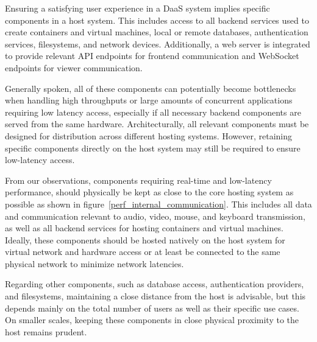 \documentclass[runningheads]{llncs}
\begin{document}
Ensuring a satisfying user experience in a DaaS system
implies specific components in a host system.
This includes access to all backend services
used to create containers and virtual machines,
local or remote databases, authentication services, filesystems, and network devices.
Additionally, a web server is integrated to provide relevant API endpoints
for frontend communication and WebSocket endpoints for viewer communication.

Generally spoken, all of these components can potentially become bottlenecks
when handling high throughputs or large amounts of concurrent applications
requiring low latency access, especially if all necessary backend components
are served from the same hardware.
Architecturally, all relevant components
must be designed for distribution across different hosting systems.
However, retaining specific components directly on the host system
may still be required to ensure low-latency access.

From our observations, components requiring real-time and low-latency performance,
should physically be kept as close to the core hosting system as possible
as shown in figure~\ref{perf_internal_communication}.
This includes all data and communication relevant to
audio, video, mouse, and keyboard transmission,
as well as all backend services for hosting containers and virtual machines.
Ideally, these components should be hosted natively on the host system
for virtual network and hardware access
or at least be connected to the same physical network
to minimize network latencies.

Regarding other components, such as database access,
authentication providers, and filesystems,
maintaining a close distance from the host is advisable,
but this depends mainly on the total number of users
as well as their specific use cases.
On smaller scales, keeping these components
in close physical proximity to the host remains prudent.
\end{document}
